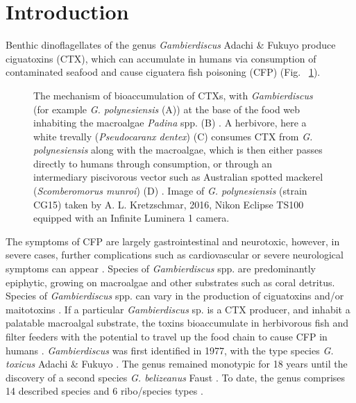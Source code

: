 \documentclass[10pt,letterpaper]{article}
\begin{document}
\section*{Introduction}
\FloatBarrier
Benthic dinoflagellates of the genus \emph{Gambierdiscus} Adachi \& Fukuyo produce ciguatoxins (CTX), which can accumulate in humans via consumption of contaminated seafood and cause ciguatera fish poisoning (CFP) (Fig. ~\ref{fig:bioaccom}). 
\begin{figure} 
\caption{The mechanism of bioaccumulation of CTXs, with \textit{Gambierdiscus} (for example \emph{G. polynesiensis} (A)) at the base of the food web inhabiting the macroalgae \emph{Padina} spp. (B) \cite{padina}. 
A herbivore, here a white trevally (\emph{Pseudocaranx dentex}) (C) \cite{trevally} consumes CTX from \emph{G. polynesiensis} along with the macroalgae, which is then either passes directly to humans through consumption, or through an intermediary piscivorous vector such as Australian spotted mackerel (\emph{Scomberomorus munroi}) (D) \cite{mackerel}. 
Image of \emph{G. polynesiensis} (strain CG15) taken by A. L. Kretzschmar, 2016, Nikon Eclipse TS100 equipped with an Infinite Luminera 1 camera.} 
\label{fig:bioaccom}
\end{figure} 
The symptoms of CFP are largely gastrointestinal and neurotoxic, however, in severe cases, further complications such as cardiovascular or severe neurological symptoms can appear \citep{sims1987theoretical}. 
Species of \emph{Gambierdiscus} spp. are predominantly epiphytic, growing on macroalgae and other substrates such as coral detritus. 
Species of \textit{Gambierdiscus} spp. can vary in the production of ciguatoxins and/or maitotoxins \citep{chinain2010ciguatera,kohli2014high}. 
If a particular \emph{Gambierdiscus} sp. is a CTX producer, and inhabit a palatable macroalgal substrate, the toxins bioaccumulate in herbivorous fish and filter feeders with the potential to travel up the food chain to cause CFP in humans  \citep{chinain1997intraspecific,holmes1998gambierdiscus}. 
\FloatBarrier
\emph{Gambierdiscus} was first identified in 1977, with the type species \emph{G. toxicus} Adachi \& Fukuyo \citep{adachi1979thecal}. 
The genus remained monotypic for 18 years until the discovery of a second species \emph{G. belizeanus} Faust \citep{faust1995observation}. 
To date, the genus comprises 14 described species and 6 ribo/species types
 \citep{smith2016new,fraga2016gambierdiscus,litaker2010global,adachi1979thecal,faust1995observation,chinain1999morphology,litaker2009taxonomy,dai2017taxonomic,nishimura2014morphology,rhodes2017new,kretzschmar2017characterization,fraga2011gambierdiscus,xu2014distribution,fraga2014genus} .
\end{document}
